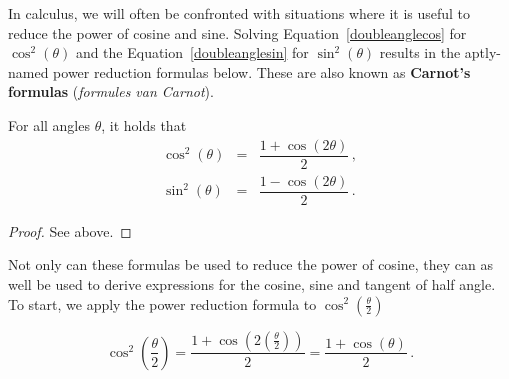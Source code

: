 In calculus, we will often be confronted with situations where it is useful to reduce the power of cosine and sine. Solving Equation~\eqref{doubleanglecos} for $\cos^{2}(\theta)$  and the Equation~\eqref{doubleanglesin} for $\sin^{2}(\theta)$ results in the aptly-named power reduction formulas below.  These are also known as \textbf{Carnot's formulas} (\textit{formules van Carnot}). 
 

\begin{theorem} \label{powerreduction} 
For all angles $\theta$, it holds that
\begin{eqnarray}
\cos^{2}(\theta) &=& \dfrac{1 + \cos(2\theta)}{2}\,,\\
\sin^{2}(\theta) &=& \dfrac{1 - \cos(2\theta)}{2}\,.
\end{eqnarray}
\vspace{-0.4cm}
\end{theorem}
\ifanalysis
\begin{proof}
See above.
\end{proof}
\fi

Not only can these formulas be used to reduce the power of cosine, they can as well be used to derive expressions for the cosine, sine and tangent of half angle. To start, we apply the power reduction formula to $\cos^{2}\left(\frac{\theta}{2}\right)$

\[ \cos^{2}\left(\dfrac{\theta}{2}\right) = \dfrac{1 + \cos\left(2 \left(\frac{\theta}{2}\right)\right)}{2} = \dfrac{1 + \cos(\theta)}{2}\,.\]




